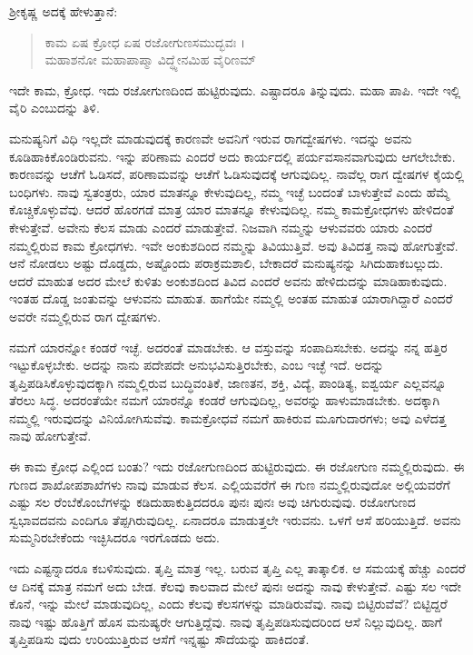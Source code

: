 ಶ್ರೀಕೃಷ್ಣ ಅದಕ್ಕೆ ಹೇಳುತ್ತಾನೆ:

\begin{verse}
ಕಾಮ ಏಷ ಕ್ರೋಧ ಏಷ ರಜೋಗುಣಸಮುದ್ಭವಃ ।\\ಮಹಾಶನೋ ಮಹಾಪಾಪ್ಮಾ ವಿದ್ಧ್ಯೇನಮಿಹ ವೈರಿಣಮ್ 
\end{verse}

{\small ಇದೇ ಕಾಮ, ಕ್ರೋಧ. ಇದು ರಜೋಗುಣದಿಂದ ಹುಟ್ಟಿರುವುದು. ಎಷ್ಟಾದರೂ ತಿನ್ನುವುದು. ಮಹಾ ಪಾಪಿ. ಇದೇ ಇಲ್ಲಿ ವೈರಿ ಎಂಬುದನ್ನು ತಿಳಿ.}

ಮನುಷ್ಯನಿಗೆ ವಿಧಿ ಇಲ್ಲದೇ ಮಾಡುವುದಕ್ಕೆ ಕಾರಣವೇ ಅವನಿಗೆ ಇರುವ ರಾಗದ್ವೇಷಗಳು. ಇದನ್ನು ಅವನು ಕೂಡಿಹಾಕಿಕೊಂಡಿರುವನು. ಇನ್ನು ಪರಿಣಾಮ ಎಂದರೆ ಅದು ಕಾರ್ಯದಲ್ಲಿ ಪರ್ಯವಸಾನವಾಗುವುದು ಆಗಲೇಬೇಕು. ಕಾರಣವನ್ನು ಆಚೆಗೆ ಓಡಿಸದೆ, ಪರಿಣಾಮವನ್ನು ಆಚೆಗೆ ಓಡಿಸುವುದಕ್ಕೆ ಆಗುವುದಿಲ್ಲ. ನಾವೆಲ್ಲ ರಾಗ ದ್ವೇಷಗಳ ಕೈಯಲ್ಲಿ ಬಂಧಿಗಳು. ನಾವು ಸ್ವತಂತ್ರರು, ಯಾರ ಮಾತನ್ನೂ ಕೇಳುವುದಿಲ್ಲ, ನಮ್ಮ ಇಚ್ಛೆ ಬಂದಂತೆ ಬಾಳುತ್ತೇವೆ ಎಂದು ಹೆಮ್ಮೆ ಕೊಚ್ಚಿಕೊಳ್ಳುವೆವು. ಆದರೆ ಹೊರಗಡೆ ಮಾತ್ರ ಯಾರ ಮಾತನ್ನೂ ಕೇಳುವುದಿಲ್ಲ. ನಮ್ಮ ಕಾಮಕ್ರೋಧಗಳು ಹೇಳಿದಂತೆ ಕೇಳುತ್ತೇವೆ. ಅವೇನು ಕೆಲಸ ಮಾಡು ಎಂದರೆ ಮಾಡುತ್ತೇವೆ. ನಿಜವಾಗಿ ನಮ್ಮನ್ನು ಆಳುವವರು ಯಾರು ಎಂದರೆ ನಮ್ಮಲ್ಲಿರುವ ಕಾಮ ಕ್ರೋಧಗಳು. ಇವೇ ಅಂಕುಶದಿಂದ ನಮ್ಮನ್ನು ತಿವಿಯುತ್ತಿವೆ. ಅವು ತಿವಿದತ್ತ ನಾವು ಹೋಗುತ್ತೇವೆ. ಆನೆ ನೋಡಲು ಅಷ್ಟು ದೊಡ್ಡದು, ಅಷ್ಟೊಂದು ಪರಾಕ್ರಮಶಾಲಿ, ಬೇಕಾದರೆ ಮನುಷ್ಯನನ್ನು ಸಿಗಿದುಹಾಕಬಲ್ಲುದು. ಆದರೆ ಮಾಹುತ ಅದರ ಮೇಲೆ ಕುಳಿತು ಅಂಕುಶದಿಂದ ತಿವಿದ ಎಂದರೆ ಅವನು ಹೇಳಿದುದನ್ನು ಮಾಡಿಹಾಕುವುದು. ಇಂತಹ ದೊಡ್ಡ ಜಂತುವನ್ನು ಆಳುವನು ಮಾಹುತ. ಹಾಗೆಯೇ ನಮ್ಮಲ್ಲಿ ಅಂತಹ ಮಾಹುತ ಯಾರಾಗಿದ್ದಾರೆ ಎಂದರೆ ಅವರೇ ನಮ್ಮಲ್ಲಿರುವ ರಾಗ ದ್ವೇಷಗಳು.

ನಮಗೆ ಯಾರನ್ನೋ ಕಂಡರೆ ಇಚ್ಛೆ. ಅದರಂತೆ ಮಾಡಬೇಕು. ಆ ವಸ್ತುವನ್ನು ಸಂಪಾದಿಸಬೇಕು. ಅದನ್ನು ನನ್ನ ಹತ್ತಿರ ಇಟ್ಟುಕೊಳ್ಳಬೇಕು. ಅದನ್ನು ನಾನು ಪದೇಪದೇ ಅನುಭವಿಸುತ್ತಿರಬೇಕು, ಎಂಬ ಇಚ್ಛೆ ಇದೆ. ಅದನ್ನು ತೃಪ್ತಿಪಡಿಸಿಕೊಳ್ಳುವುದಕ್ಕಾಗಿ ನಮ್ಮಲ್ಲಿರುವ ಬುದ್ಧಿವಂತಿಕೆ, ಜಾಣತನ, ಶಕ್ತಿ, ವಿದ್ಯೆ, ಪಾಂಡಿತ್ಯ, ಐಶ್ವರ್ಯ ಎಲ್ಲವನ್ನೂ ತೆರಲು ಸಿದ್ಧ. ಅದರಂತೆಯೇ ನಮಗೆ ಯಾರನ್ನೊ ಕಂಡರೆ ಆಗುವುದಿಲ್ಲ, ಅವರನ್ನು ಹಾಳುಮಾಡಬೇಕು. ಅದಕ್ಕಾಗಿ ನಮ್ಮಲ್ಲಿ ಇರುವುದನ್ನು ವಿನಿಯೋಗಿಸುವೆವು. ಕಾಮಕ್ರೋಧವೆ ನಮಗೆ ಹಾಕಿರುವ ಮೂಗುದಾರಗಳು; ಅವು ಎಳೆದತ್ತ ನಾವು ಹೋಗುತ್ತೇವೆ.

ಈ ಕಾಮ ಕ್ರೋಧ ಎಲ್ಲಿಂದ ಬಂತು? ಇದು ರಜೋಗುಣದಿಂದ ಹುಟ್ಟಿರುವುದು. ಈ ರಜೋಗುಣ ನಮ್ಮಲ್ಲಿರುವುದು. ಈ ಗುಣದ ಶಾಖೋಪಶಾಖೆಗಳು ನಾವು ಮಾಡುವ ಕೆಲಸ. ಎಲ್ಲಿಯವರೆಗೆ ಈ ಗುಣ ನಮ್ಮಲ್ಲಿರುವುದೋ ಅಲ್ಲಿಯವರೆಗೆ ಎಷ್ಟು ಸಲ ರೆಂಬೆಕೊಂಬೆಗಳನ್ನು ಕಡಿದುಹಾಕುತ್ತಿದದರೂ ಪುನಃ ಪುನಃ ಅವು ಚಿಗುರುವುವು. ರಜೋಗುಣದ ಸ್ವಭಾವದವನು ಎಂದಿಗೂ ತೆಪ್ಪಗಿರುವುದಿಲ್ಲ. ಏನಾದರೂ ಮಾಡುತ್ತಲೇ ಇರುವನು. ಒಳಗೆ ಆಸೆ ಹರಿಯುತ್ತಿದೆ. ಅವನು ಸುಮ್ಮನಿರಬೇಕೆಂದು ಇಚ್ಛಿಸಿದರೂ ಇರಗೊಡದು ಅದು.

ಇದು ಎಷ್ಟನ್ನಾದರೂ ಕಬಳಿಸುವುದು. ತೃಪ್ತಿ ಮಾತ್ರ ಇಲ್ಲ. ಬರುವ ತೃಪ್ತಿ ಎಲ್ಲ ತಾತ್ಕಾಲಿಕ. ಆ ಸಮಯಕ್ಕೆ ಹೆಚ್ಚು ಎಂದರೆ ಆ ದಿನಕ್ಕೆ ಮಾತ್ರ ನಮಗೆ ಅದು ಬೇಡ. ಕೆಲವು ಕಾಲವಾದ ಮೇಲೆ ಪುನಃ ಅದನ್ನು ನಾವು ಕೇಳುತ್ತೇವೆ. ಎಷ್ಟು ಸಲ ಇದೇ ಕೊನೆ, ಇನ್ನು ಮೇಲೆ ಮಾಡುವುದಿಲ್ಲ, ಎಂದು ಕೆಲವು ಕೆಲಸಗಳನ್ನು ಮಾಡಿರುವೆವು. ನಾವು ಬಿಟ್ಟಿರುವೆವೆ? ಬಿಟ್ಟಿದ್ದರೆ ನಾವು ಇಷ್ಟು ಹೊತ್ತಿಗೆ ಹೊಸ ಮನುಷ್ಯರೇ ಆಗುತ್ತಿದ್ದೆವು. ನಾವು ತೃಪ್ತಿಪಡಿಸುವುದರಿಂದ ಆಸೆ ನಿಲ್ಲುವುದಿಲ್ಲ. ಹಾಗೆ ತೃಪ್ತಿಪಡಿಸು ವುದು ಉರಿಯುತ್ತಿರುವ ಆಸೆಗೆ ಇನ್ನಷ್ಟು ಸೌದೆಯನ್ನು ಹಾಕಿದಂತೆ.

